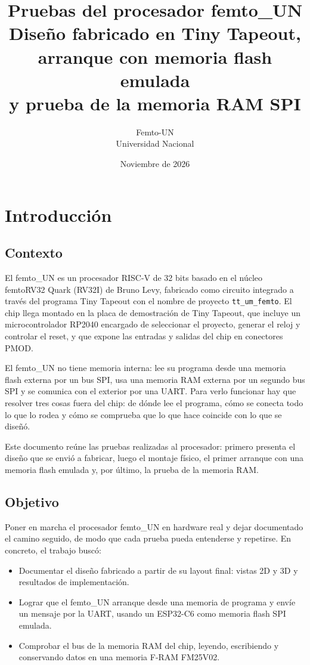 \documentclass[11pt,letterpaper,oneside]{report}
\title{\textbf{Pruebas del procesador femto\_UN}\\[6pt]
\Large Diseño fabricado en Tiny Tapeout, arranque con memoria flash emulada\\ y prueba de la memoria RAM SPI}
\author{Femto-UN\\ Universidad Nacional}
\date{Noviembre de 2026}
\newcommand{\code}[1]{\texttt{#1}}
\begin{document}
\maketitle
\tableofcontents

\chapter{Introducción}

\section{Contexto}

El femto\_UN es un procesador RISC-V de 32 bits basado en el núcleo femtoRV32 Quark (RV32I) de Bruno Levy, fabricado como circuito integrado a través del programa Tiny Tapeout con el nombre de proyecto \code{tt\_um\_femto}. El chip llega montado en la placa de demostración de Tiny Tapeout, que incluye un microcontrolador RP2040 encargado de seleccionar el proyecto, generar el reloj y controlar el reset, y que expone las entradas y salidas del chip en conectores PMOD.

El femto\_UN no tiene memoria interna: lee su programa desde una memoria flash externa por un bus SPI, usa una memoria RAM externa por un segundo bus SPI y se comunica con el exterior por una UART. Para verlo funcionar hay que resolver tres cosas fuera del chip: de dónde lee el programa, cómo se conecta todo lo que lo rodea y cómo se comprueba que lo que hace coincide con lo que se diseñó.

Este documento reúne las pruebas realizadas al procesador: primero presenta el diseño que se envió a fabricar, luego el montaje físico, el primer arranque con una memoria flash emulada y, por último, la prueba de la memoria RAM.

\section{Objetivo}

Poner en marcha el procesador femto\_UN en hardware real y dejar documentado el camino seguido, de modo que cada prueba pueda entenderse y repetirse. En concreto, el trabajo buscó:

\begin{itemize}
  \item Documentar el diseño fabricado a partir de su layout final: vistas 2D y 3D y resultados de implementación.
  \item Lograr que el femto\_UN arranque desde una memoria de programa y envíe un mensaje por la UART, usando un ESP32-C6 como memoria flash SPI emulada.
  \item Comprobar el bus de la memoria RAM del chip, leyendo, escribiendo y conservando datos en una memoria F-RAM FM25V02.
\end{itemize}
\end{document}
